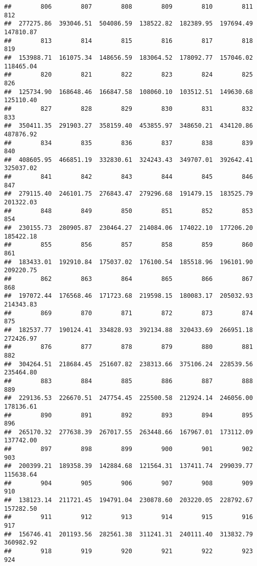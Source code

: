 \documentclass[
]{article}
\begin{document}
\begin{verbatim}
##        806        807        808        809        810        811        812 
##  277275.86  393046.51  504086.59  138522.82  182389.95  197694.49  147810.87 
##        813        814        815        816        817        818        819 
##  153988.71  161075.34  148656.59  183064.52  178092.77  157046.02  118465.04 
##        820        821        822        823        824        825        826 
##  125734.90  168648.46  166847.58  108060.10  103512.51  149630.68  125110.40 
##        827        828        829        830        831        832        833 
##  350411.35  291903.27  358159.40  453855.97  348650.21  434120.86  487876.92 
##        834        835        836        837        838        839        840 
##  408605.95  466851.19  332830.61  324243.43  349707.01  392642.41  325037.02 
##        841        842        843        844        845        846        847 
##  279115.40  246101.75  276843.47  279296.68  191479.15  183525.79  201322.03 
##        848        849        850        851        852        853        854 
##  230155.73  280905.87  230464.27  214084.06  174022.10  177206.20  185422.18 
##        855        856        857        858        859        860        861 
##  183433.01  192910.84  175037.02  176100.54  185518.96  196101.90  209220.75 
##        862        863        864        865        866        867        868 
##  197072.44  176568.46  171723.68  219598.15  180083.17  205032.93  214343.83 
##        869        870        871        872        873        874        875 
##  182537.77  190124.41  334828.93  392134.88  320433.69  266951.18  272426.97 
##        876        877        878        879        880        881        882 
##  304264.51  218684.45  251607.82  238313.66  375106.24  228539.56  235464.80 
##        883        884        885        886        887        888        889 
##  229136.53  226670.51  247754.45  225500.58  212924.14  246056.00  178136.61 
##        890        891        892        893        894        895        896 
##  265170.32  277638.39  267017.55  263448.66  167967.01  173112.09  137742.00 
##        897        898        899        900        901        902        903 
##  200399.21  189358.39  142884.68  121564.31  137411.74  299039.77  115638.64 
##        904        905        906        907        908        909        910 
##  138123.14  211721.45  194791.04  230878.60  203220.05  228792.67  157282.50 
##        911        912        913        914        915        916        917 
##  156746.41  201193.56  282561.38  311241.31  240111.40  313832.79  360982.92 
##        918        919        920        921        922        923        924 

\end{verbatim}
\end{document}
